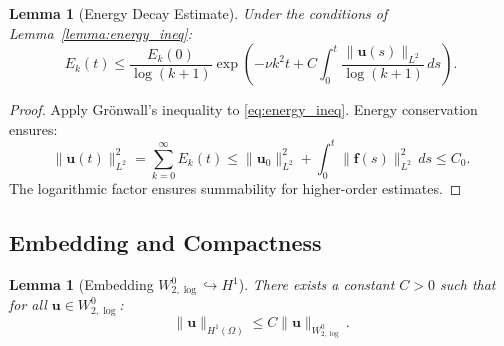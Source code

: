 \documentclass[12pt]{article}
\newtheorem{lemma}[theorem]{Lemma}
\begin{document}
\begin{lemma}[Energy Decay Estimate]
\label{lemma:energy_decay}
Under the conditions of Lemma~\ref{lemma:energy_ineq}:
\begin{equation}
E_k(t) \leq \frac{E_k(0)}{\log(k + 1)} \exp\left(-\nu k^2 t + 
C \int_0^t \frac{\|\mathbf{u}(s)\|_{L^2}}{\log(k + 1)} \, ds\right).
\end{equation}
\end{lemma}

\begin{proof}
Apply Gr\"onwall's inequality to \eqref{eq:energy_ineq}. Energy conservation ensures:
\begin{equation}
\|\mathbf{u}(t)\|^2_{L^2} = \sum_{k=0}^\infty E_k(t) \leq \|\mathbf{u}_0\|^2_{L^2} + 
\int_0^t \|\mathbf{f}(s)\|^2_{L^2} \, ds \leq C_0.
\end{equation}
The logarithmic factor ensures summability for higher-order estimates.
\end{proof}

\subsection{Embedding and Compactness}
\begin{lemma}[Embedding $W^0_{2,\log} \hookrightarrow H^1$]
\label{lemma:embedding}
There exists a constant $C > 0$ such that for all $\mathbf{u} \in W^0_{2,\log}$:
\begin{equation}
\|\mathbf{u}\|_{H^1(\Omega)} \leq C \|\mathbf{u}\|_{W^0_{2,\log}}.
\end{equation}
\end{lemma}
\end{document}
